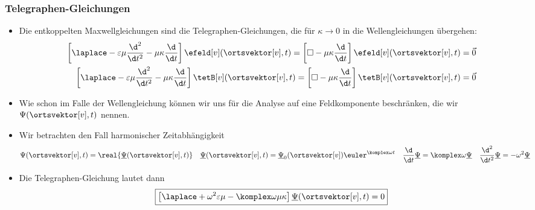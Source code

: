 \begin{frame}
  \frametitle{Telegraphen-Gleichungen}
  \begin{itemize}[<+->]
  \item Die entkoppelten Maxwellgleichungen sind die \alert{Telegraphen-Gleichungen}, die für \(\kappa \to 0\) in die Wellengleichungen übergehen:
    \begin{align*}
      \left[\laplace - \varepsilon\mu \frac{\d^2}{\d t^2} -\mu\kappa \frac{\d}{\d t}\right]\efeld[v](\ortsvektor[v], t) = \left[\square -\mu\kappa \frac{\d}{\d t}\right]\efeld[v](\ortsvektor[v], t) &= \vec{0}\\
      \left[\laplace - \varepsilon\mu \frac{\d^2}{\d t^2} -\mu\kappa \frac{\d}{\d t}\right]\tetB[v](\ortsvektor[v], t) = \left[\square -\mu\kappa \frac{\d}{\d t}\right]\tetB[v](\ortsvektor[v], t)&= \vec{0}
    \end{align*}
  \item Wie schon im Falle der Wellengleichung können wir uns für die Analyse auf eine Feldkomponente beschränken, die wir \(\Psi(\ortsvektor[v], t)\) nennen.
  \item Wir betrachten den Fall \alert{harmonischer Zeitabhängigkeit}
    \begin{align*}
      \Psi(\ortsvektor[v], t) &= \real{\underline{\Psi}(\ortsvektor[v], t)} & \underline{\Psi}(\ortsvektor[v], t) &= \underline{\Psi}_0(\ortsvektor[v]) \euler^{\komplex\omega t} & \frac{\d}{\d t} \underline{\Psi} &= \komplex\omega \underline{\Psi} & \frac{\d^2}{\d t^2} \underline{\Psi} &= -\omega^2 \underline{\Psi} 
    \end{align*}
  \item Die Telegraphen-Gleichung lautet dann
    \begin{equation*}
      \boxed{\left[ \laplace + \omega^2\varepsilon\mu - \komplex\omega\mu\kappa \right] \underline{\Psi}(\ortsvektor[v], t) =0}
      \end{equation*}
    \end{itemize}
  \end{frame}
    

